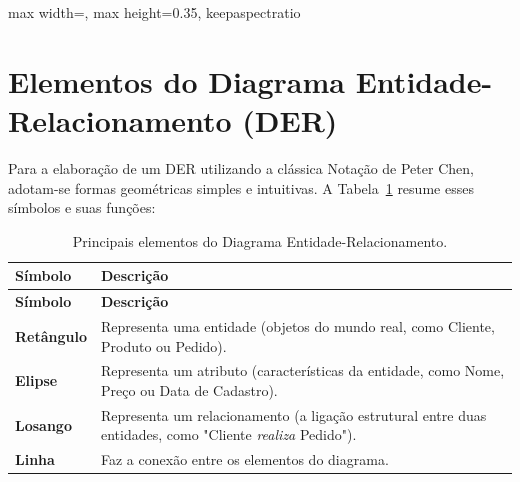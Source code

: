 \begin{diagramER}
\begin{center}
\begin{adjustbox}{max width=\linewidth, max height=0.35\textheight, keepaspectratio}
\end{adjustbox}
    \label{fig:der_historico}
    \end{center}
\end{diagramER}

\section{Elementos do Diagrama Entidade-Relacionamento (DER)}
Para a elaboração de um DER utilizando a clássica Notação de Peter Chen, adotam-se formas geométricas simples e intuitivas. A Tabela~\ref{tab:elementos_der} resume esses símbolos e suas funções:

\begin{center}
\renewcommand{\arraystretch}{1.4}
\begin{longtable}{|l|p{10cm}|}
\caption{Principais elementos do Diagrama Entidade-Relacionamento.}
\label{tab:elementos_der} \\

\hline
\textbf{Símbolo} & \textbf{Descrição} \\ \hline
\endfirsthead

\hline
\textbf{Símbolo} & \textbf{Descrição} \\ \hline
\endhead

\hline
\endlastfoot

\textbf{Retângulo} & Representa uma entidade (objetos do mundo real, como Cliente, Produto ou Pedido). \\ \hline
\textbf{Elipse} & Representa um atributo (características da entidade, como Nome, Preço ou Data de Cadastro). \\ \hline
\textbf{Losango} & Representa um relacionamento (a ligação estrutural entre duas entidades, como "Cliente \textit{realiza} Pedido"). \\ \hline
\textbf{Linha} & Faz a conexão entre os elementos do diagrama. \\
\end{longtable}
\end{center}

